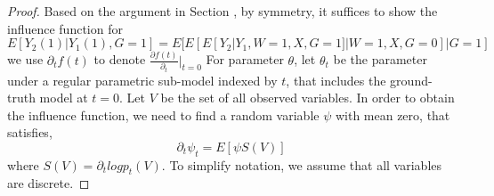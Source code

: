 \documentclass{article}
\begin{document}
\begin{proof}
    Based on the argument in Section \qu , by symmetry, it suffices to show the influence function  for $E[ Y_2(1) | Y_1(1) , G=1] = E[ E[E [ Y_2 | Y_1 ,W=1,X, G=1] | W=1, X, G=0 ] | G=1]$
    we use $ \partial_t f(t) $ to denote $\frac{ \partial f(t) }{ \partial_t } |_{t= 0 } $ For parameter $\theta $, let $ \theta_t $ be the parameter under a regular parametric sub-model indexed by $t$, that includes the ground-truth model at $t=0$.
    Let $V$ be the set of all observed variables. In order to obtain the influence function, we need to find a random variable $\psi $ with mean zero, that satisfies, 
    \begin{equation}
        \partial_t \psi_t = E [ \psi S(V) ]
    \end{equation}
    where $ S(V) = \partial_t log p_t (V) $.
    To simplify notation, we assume that all variables are discrete. 


\end{proof}
\end{document}

